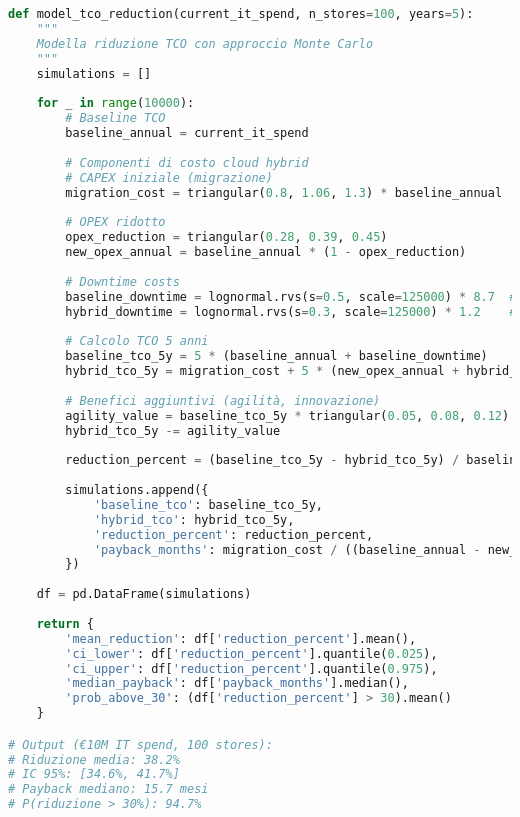 \begin{lstlisting}[language=Python, caption=Modello riduzione TCO]
def model_tco_reduction(current_it_spend, n_stores=100, years=5):
    """
    Modella riduzione TCO con approccio Monte Carlo
    """
    simulations = []
    
    for _ in range(10000):
        # Baseline TCO
        baseline_annual = current_it_spend
        
        # Componenti di costo cloud hybrid
        # CAPEX iniziale (migrazione)
        migration_cost = triangular(0.8, 1.06, 1.3) * baseline_annual
        
        # OPEX ridotto
        opex_reduction = triangular(0.28, 0.39, 0.45)
        new_opex_annual = baseline_annual * (1 - opex_reduction)
        
        # Downtime costs
        baseline_downtime = lognormal.rvs(s=0.5, scale=125000) * 8.7  # ore/anno
        hybrid_downtime = lognormal.rvs(s=0.3, scale=125000) * 1.2    # ridotto 86%
        
        # Calcolo TCO 5 anni
        baseline_tco_5y = 5 * (baseline_annual + baseline_downtime)
        hybrid_tco_5y = migration_cost + 5 * (new_opex_annual + hybrid_downtime)
        
        # Benefici aggiuntivi (agilità, innovazione)
        agility_value = baseline_tco_5y * triangular(0.05, 0.08, 0.12)
        hybrid_tco_5y -= agility_value
        
        reduction_percent = (baseline_tco_5y - hybrid_tco_5y) / baseline_tco_5y * 100
        
        simulations.append({
            'baseline_tco': baseline_tco_5y,
            'hybrid_tco': hybrid_tco_5y,
            'reduction_percent': reduction_percent,
            'payback_months': migration_cost / ((baseline_annual - new_opex_annual) / 12)
        })
        
    df = pd.DataFrame(simulations)
    
    return {
        'mean_reduction': df['reduction_percent'].mean(),
        'ci_lower': df['reduction_percent'].quantile(0.025),
        'ci_upper': df['reduction_percent'].quantile(0.975),
        'median_payback': df['payback_months'].median(),
        'prob_above_30': (df['reduction_percent'] > 30).mean()
    }

# Output (€10M IT spend, 100 stores):
# Riduzione media: 38.2%
# IC 95%: [34.6%, 41.7%]
# Payback mediano: 15.7 mesi
# P(riduzione > 30%): 94.7%
\end{lstlisting}

